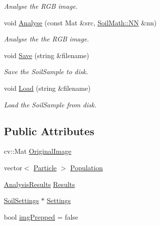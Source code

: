 \begin{DoxyCompactItemize}
\begin{DoxyCompactList}\small\item\em Analyse the R\+G\+B image. \end{DoxyCompactList}\item 
void \hyperlink{class_soil_analyzer_1_1_sample_a5555ad91e224aeb59e2a301f23e1899f}{Analyse} (const Mat \&src, \hyperlink{class_soil_math_1_1_n_n}{Soil\+Math\+::\+N\+N} \&nn)
\begin{DoxyCompactList}\small\item\em Analyse the the R\+G\+B image. \end{DoxyCompactList}\item 
void \hyperlink{class_soil_analyzer_1_1_sample_a00fd0ec3bbea70454a6d8a6c1aaf34df}{Save} (string \&filename)
\begin{DoxyCompactList}\small\item\em Save the Soil\+Sample to disk. \end{DoxyCompactList}\item 
void \hyperlink{class_soil_analyzer_1_1_sample_a88f29d8ee3fad37cdad6cb88b2c8a288}{Load} (string \&filename)
\begin{DoxyCompactList}\small\item\em Load the Soil\+Sample from disk. \end{DoxyCompactList}\end{DoxyCompactItemize}
\subsection*{Public Attributes}
\begin{DoxyCompactItemize}
\item 
cv\+::\+Mat \hyperlink{class_soil_analyzer_1_1_sample_a0d6e6fca9e232a77329daf0b4b29c634}{Original\+Image}
\item 
vector$<$ \hyperlink{class_soil_analyzer_1_1_particle}{Particle} $>$ \hyperlink{class_soil_analyzer_1_1_sample_ab87a190f2b4a49bc71b355f9c52d8aa4}{Population}
\item 
\hyperlink{class_soil_analyzer_1_1_analysis_results}{Analysis\+Results} \hyperlink{class_soil_analyzer_1_1_sample_ab242ae1c2f229168fd630a9f31d7237f}{Results}
\item 
\hyperlink{class_soil_analyzer_1_1_soil_settings}{Soil\+Settings} $\ast$ \hyperlink{class_soil_analyzer_1_1_sample_a31f7b29fc46497f9b2847285c7893832}{Settings}
\item 
bool \hyperlink{class_soil_analyzer_1_1_sample_ab025a26f7276128a5a974cae15b51dfc}{img\+Prepped} = false
\end{DoxyCompactItemize}
